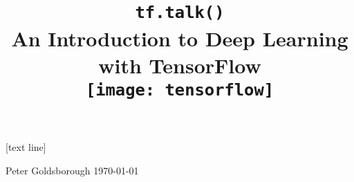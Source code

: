 





{
[text line]{%
  \parbox{\linewidth}{%
    \vspace*{-20pt}%
    \footnotesize Peter Goldsborough\hspace{5.2cm} {\today}}%
}

\begin{frame}
    \title{
      \vspace{1.6cm}\\
      {\Huge \texttt{tf.talk()}}\\
      \vspace{0.75cm}
      An Introduction to Deep Learning\\ with TensorFlow\\
      \vspace{0.75cm}
      \texttt{[image: tensorflow]}}
      \date{}
    \titlepage
\end{frame}
}

\addtocounter{framenumber}{-1}














